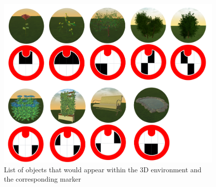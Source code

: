 \begin{figure}[H]
	\centering
	\includegraphics[width=0.9\linewidth]{figure/Appendices/markersOverview.png}
	\caption{List of objects that would appear within the 3D environment and the corresponding marker}
	\label{fig:markerOverview}
\end{figure}









